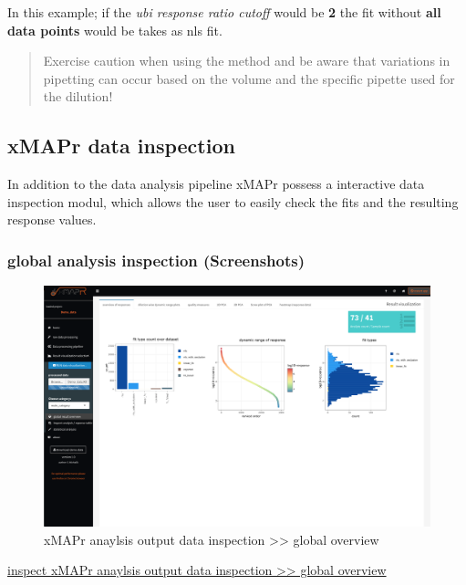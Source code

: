 \documentclass[
]{book}
\begin{document}
In this example; if the \emph{ubi response ratio cutoff} would be \textbf{2} the fit without \textbf{all data points} would be takes as nls fit.

\begin{quote}
Exercise caution when using the method and be aware that variations in pipetting can occur based on the volume and the specific pipette used for the dilution!
\end{quote}

\subsection{xMAPr data inspection}\label{xmapr-data-inspection}

In addition to the data analysis pipeline xMAPr possess a interactive data inspection modul, which allows the user to easily check the fits and the resulting response values.

\subsubsection{global analysis inspection (Screenshots)}\label{global-analysis-inspection-screenshots}

\begin{figure}

{\centering \includegraphics[width=50.5in]{figures/global_result_overview} 

}

\caption{xMAPr anaylsis output data inspection >> global overview}\label{fig:globalResultOverview}
\end{figure}

\href{figures/global_result_overview.png}{inspect xMAPr anaylsis output data inspection \textgreater\textgreater{} global overview}
\end{document}
